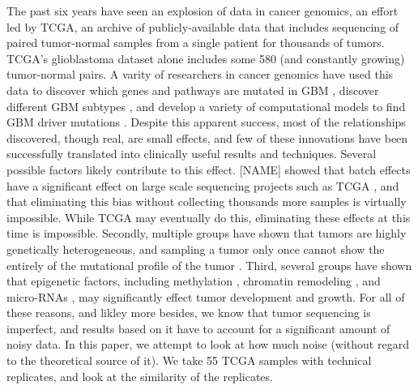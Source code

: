 \documentclass[11pt]{article} %
\begin{document}
The past six years have seen an explosion of data in cancer genomics, an effort led by TCGA, an archive of publicly-available data that includes sequencing of paired tumor-normal samples from a single patient for thousands of tumors. TCGA's glioblastoma dataset alone includes some 580 (and constantly growing) tumor-normal pairs. A varity of researchers in cancer genomics have used this data to discover which genes and pathways are mutated in GBM \cite{pathways}, discover different GBM subtypes \cite{subtypes}, and develop a variety of computational models to find GBM driver mutations \cite{drivers}. Despite this apparent success, most of the relationships discovered, though real, are small effects, and few of these innovations have been successfully translated into clinically useful results and techniques. Several possible factors likely contribute to this effect.
[NAME] showed that batch effects have a significant effect on large scale sequencing projects such as TCGA \cite{batch-effects}, and that eliminating this bias without collecting thousands more samples is virtually impossible. While TCGA may eventually do this, eliminating these effects at this time is impossible. Secondly, multiple groups have shown that tumors are highly genetically heterogeneous, and sampling a tumor only once cannot show the entirely of the mutational profile of the tumor \cite{ValentineD} \cite{hetero1} \cite{hetero2}. Third, several groups have shown that epigenetic factors, including methylation \cite{methylation-new}, chromatin remodeling \cite{chromatin}, and micro-RNAs \cite{microRNA}, may significantly effect tumor development and growth. 
For all of these reasons, and likley more besides, we know that tumor sequencing is imperfect, and results based on it have to account for a significant amount of noisy data. In this paper, we attempt to look at how much noise (without regard to the theoretical source of it). We take 55 TCGA samples with technical replicates, and look at the similarity of the replicates. 
\end{document}
